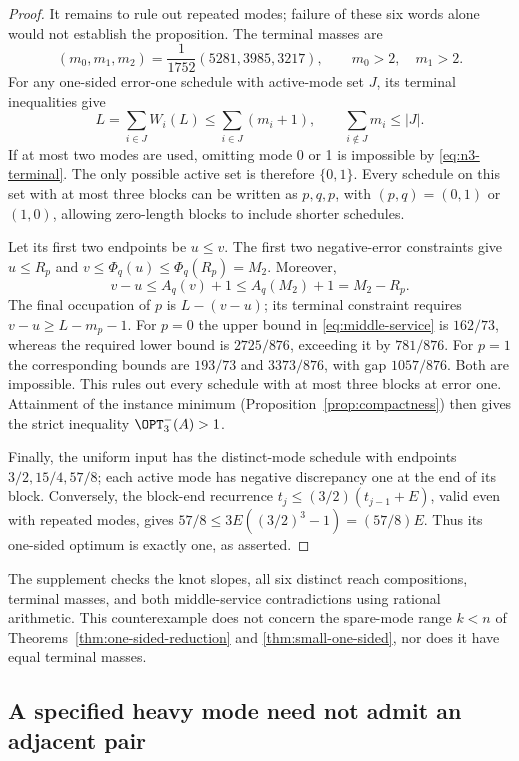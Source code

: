 \begin{proof}
It remains to rule out repeated modes; failure of these six words alone
would not establish the proposition. The terminal masses are
\begin{equation}\label{eq:n3-terminal}
 (m_0,m_1,m_2)=\frac1{1752}(5281,3985,3217),
 \qquad m_0>2,\quad m_1>2.
\end{equation}
For any one-sided error-one schedule with active-mode set $J$, its
terminal inequalities give
\[
 L=\sum_{i\in J}W_i(L)\le\sum_{i\in J}(m_i+1),
 \qquad \sum_{i\notin J}m_i\le |J|.
\]
If at most two modes are used, omitting mode 0 or 1 is impossible by
\eqref{eq:n3-terminal}. The only possible active set is therefore
$\{0,1\}$. Every schedule on this set with at most three blocks can be
written as $p,q,p$, with $(p,q)=(0,1)$ or $(1,0)$, allowing zero-length
blocks to include shorter schedules.

Let its first two endpoints be $u\le v$. The first two negative-error
constraints give $u\le R_p$ and $v\le\Phi_q(u)\le\Phi_q(R_p)=M_2$.
Moreover,
\begin{equation}\label{eq:middle-service}
 v-u\le A_q(v)+1\le A_q(M_2)+1=M_2-R_p.
\end{equation}
The final occupation of $p$ is $L-(v-u)$; its terminal constraint requires
$v-u\ge L-m_p-1$. For $p=0$ the upper bound in
\eqref{eq:middle-service} is $162/73$, whereas the required lower bound
is $2725/876$, exceeding it by $781/876$. For $p=1$ the corresponding
bounds are $193/73$ and $3373/876$, with gap $1057/876$. Both are
impossible. This rules out every schedule with at most three blocks at
error one. Attainment of the instance minimum
(Proposition~\ref{prop:compactness}) then gives the strict inequality
$\OPT^-_3(A)>1$.

Finally, the uniform input has the distinct-mode schedule with endpoints
$3/2,15/4,57/8$; each active mode has negative discrepancy one at the end
of its block. Conversely, the block-end recurrence
$t_j\le(3/2)(t_{j-1}+E)$, valid even with repeated modes, gives
$57/8\le3E((3/2)^3-1)=(57/8)E$. Thus its one-sided optimum is exactly
one, as asserted.
\end{proof}

The supplement checks the knot slopes, all six distinct reach compositions,
terminal masses, and both middle-service contradictions using rational
arithmetic. This counterexample does not concern the spare-mode range
$k<n$ of Theorems~\ref{thm:one-sided-reduction} and
\ref{thm:small-one-sided}, nor does it have equal terminal masses.

\subsection{A specified heavy mode need not admit an adjacent pair}

